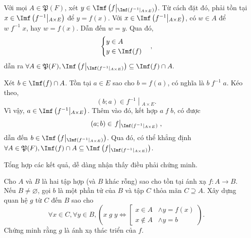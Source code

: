 \stepSubexercise Với mọi $A \in \mathfrak{P}(F)$, xét $y \in \Imf\left(f\middle|_{\Imf\left(f^{-1}\middle|_{A \times E}\right)}\right)$. Từ cách đặt đó, phải tồn tại $x \in \Imf\left(f^{-1}\middle|_{A \times E}\right)$ để $y = f(x)$. Với $x \in \Imf\left(f^{-1}\middle|_{A \times E}\right)$, có $w \in A$ để $w\;f^{-1}\;x$, hay $w = f(x)$. Dẫn đến $w = y$. Qua đó, \begin{equation*}
   \begin{cases}
      y \in A \\
      y \in \Imf(f)
   \end{cases},
\end{equation*}
dẫn ra $
   \forall A \in \mathfrak{P}(F), \Imf\left(f\middle|_{\Imf\left(f^{-1}\middle|_{A \times E}\right)}\right) \subseteq  \Imf(f) \cap A.
$

Xét $b \in \Imf(f) \cap A$. Tồn tại $a \in E$ sao cho $b = f(a)$, có nghĩa là $b\;f^{-1}\;a$. Kéo theo, \begin{equation*}
   (b; a) \in \left.f^{-1}\middle|_{A \times E}\right..
\end{equation*}  
Vì vậy, $a \in \Imf\left(f^{-1}\middle|_{A \times E}\right)$. Thêm vào đó, kết hợp $a\;f\;b$, có được \begin{equation*}
   (a; b) \in \left.f\middle|_{\Imf\left(f^{-1}\middle|_{A \times E}\right)}\right.,
\end{equation*}
dẫn đến $b \in \Imf\left(f\middle|_{\Imf\left(f^{-1}\middle|_{A \times E}\right)}\right)$. Qua đó, có thể khẳng định $\forall A \in \mathfrak{P}(F), \Imf(f) \cap A \subseteq \Imf\left(f\middle|_{\Imf\left(f^{-1}\middle|_{A \times E}\right)}\right)$.

Tổng hợp các kết quả, dễ dàng nhận thấy điều phải chứng minh.

\exercise Cho $A$ và $B$ là hai tập hợp (và $B$ khác rỗng) sao cho tồn tại ánh xạ $f: A \to B$. Nếu $B \neq \varnothing$, gọi $b$ là một phần tử của $B$ và tập $C$ thỏa mãn $C \supseteq A$. Xây dựng quan hệ $g$ từ $C$ đến $B$ sao cho \begin{equation*}
   \forall x \in C, \forall y \in B, \left(x\;g\;y \iff \left[\begin{aligned}         
      x \in A &\land y = f(x) \\
      x \notin A &\land y = b
\end{aligned}
\right.\right).
\end{equation*} 
Chứng minh rằng $g$ là ánh xạ thác triển của $f$.

\solution

